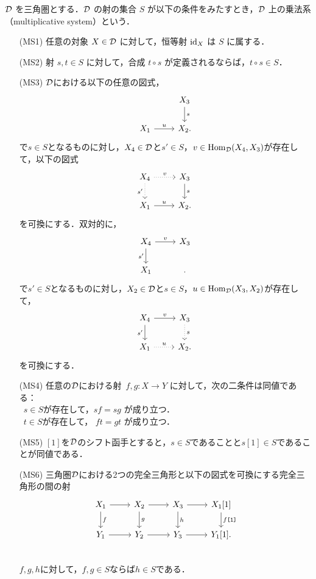 \begin{defn}[乗法系]\cite[p.152]{KS06}\label{multiplicative}
${\mathcal D}$ を三角圏とする．${\mathcal D}$ の射の集合 $S$ が以下の条件をみたすとき，${\mathcal D}$ 上の乗法系（multiplicative system）という．
\begin{itemize}
  \item[(MS1)] 任意の対象 $X \in {\mathcal D}$ に対して，恒等射 $\mathrm{id}_X$ は $S$ に属する．
  
  \item[(MS2)] 射 $s, t \in S$ に対して，合成 $t \circ s$ が定義されるならば，$t \circ s \in S$．
  
  \item[(MS3)] ${\mathcal D}$における以下の任意の図式，
  \[
  \begin{tikzcd}
		& X_3 \ar[d, "s"] \\
  X_1 \ar[r, "u"] & X_2.
  \end{tikzcd}
  \]
	で$s\in S$となるものに対し，$X_4\in{\mathcal D}$と$s'\in S$，$v\in\operatorname{\mathrm{Hom}}_{{\mathcal D}}(X_4,X_3)$が存在して，以下の図式
  \[
  \begin{tikzcd}
  X_4 \ar[r,dotted,"v"] \ar[d, "s'"',dotted] & X_3 \ar[d, "s"] \\
  X_1 \ar[r, "u"] & X_2.
  \end{tikzcd}
  \]
	を可換にする．双対的に，
  \[
  \begin{tikzcd}
		X_4\ar[r,"v"]\ar[d,"s'",swap]& X_3\\
  X_1  & .
  \end{tikzcd}
  \]
	で$s'\in S$となるものに対し，$X_2\in{\mathcal D}$と$s\in S$，$u\in\operatorname{\mathrm{Hom}}_{{\mathcal D}}(X_3,X_2)$が存在して，
  \[
  \begin{tikzcd}
  X_4 \ar[r,"v"] \ar[d, "s'"'] & X_3 \ar[d, "s",dotted] \\
  X_1 \ar[r, "u",dotted] & X_2.
  \end{tikzcd}
  \]
	を可換にする．
\item[(MS4)]
任意の${\mathcal D}$における射\ $f,g: X \to Y$ に対して，次の二条件は同値である：\\
   \bullet\ $s \in S$が存在して，$sf = sg$ が成り立つ．\\
	\bullet\ 	$t \in S$が存在して， $ft = gt$ が成り立つ．

\item[(MS5)]
	$[1]$を${\mathcal D}$のシフト函手とすると，$s\in S$であることと$s[1]\in S$であることが同値である．
\item[(MS6)]
三角圏${\mathcal D}$における2つの完全三角形と以下の図式を可換にする完全三角形の間の射
			\[
		\begin{tikzcd}
			X_1\ar[r]\ar[d,"f"]& X_2\ar[r]\ar[d,"g"]& X_3\ar[r]\ar[d,"h"] & X_1[1]\ar[d,"f\texttt{[1]}"]\\
			Y_1\ar[r]& Y_2\ar[r]& Y_3\ar[r] & Y_1[1].\\
		\end{tikzcd}
			\]
$f,g,h$に対して，$f,g\in S$ならば$h\in S$である．
\end{itemize}
\end{defn}

